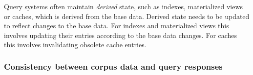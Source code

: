 







Query systems often maintain \textit{derived} state, such as indexes, materialized views or caches, which is
derived from the base data.
Derived state needs to be updated to reflect changes to the base data.
For indexes and materialized views this involves updating their entries according to the base data changes.
For caches this involves invalidating obsolete cache entries.


\subsubsection{Consistency between corpus data and query responses}

